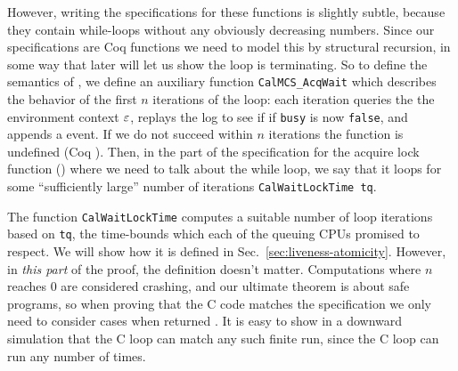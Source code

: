 However, writing the specifications for these functions is slightly subtle, 
because they contain
while-loops without any obviously decreasing numbers. Since our
specifications are Coq functions we need to model this by structural
recursion, in some way that later will let us show the loop is terminating.
So to define the semantics of ,
we define an auxiliary function
\lstinline$CalMCS_AcqWait$ which describes the
behavior of the first $n$ iterations of the loop: each iteration
queries the the environment context ${\varepsilon}$, replays the log to see if if \lstinline$busy$ is now \lstinline$false$, and appends a  event.
If we do not succeed within $n$ iterations the function is undefined (Coq ).
Then, in the part of the  specification for the  acquire lock 
function () where we need to talk about the while loop,
we say that it loops for some ``sufficiently large'' 
number of iterations \lstinline$CalWaitLockTime tq$. 

The function \lstinline$CalWaitLockTime$ computes a suitable 
number of loop iterations based on \lstinline$tq$, the time-bounds  which each of the queuing CPUs promised to respect.
We will show how it is defined in Sec.~\ref{sec:liveness-atomicity}. 
However, in \emph{this part} of the proof, the definition doesn't matter. 
Computations where $n$ reaches 0 are considered crashing, and our
ultimate theorem is about safe programs, so when proving that the C
code matches the specification we only need to 
consider cases when  returned .
It is easy to show in a downward simulation that the C loop can match any such finite run, 
since the C loop can run any number of times.
%
%
%
%
